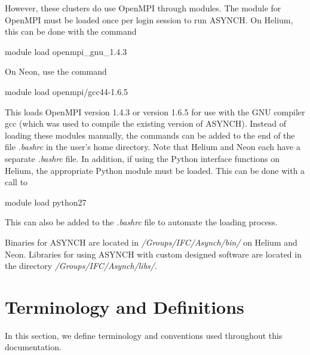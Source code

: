 \documentclass[12pt]{article}
\newenvironment{codeindent}
{\begin{list}{}
        {\setlength{\leftmargin}{.1in}}
        \item[]
}
{\end{list}}
\begin{document}
However, these clusters do use OpenMPI through modules. The module for OpenMPI must be loaded once per login session to run ASYNCH. On Helium, this can be done with the command
\begin{codeindent}
module load openmpi\_gnu\_1.4.3
\end{codeindent}
On Neon, use the command
\begin{codeindent}
module load openmpi/gcc44-1.6.5
\end{codeindent}
This loads OpenMPI version 1.4.3 or version 1.6.5 for use with the GNU compiler gcc (which was used to compile the existing version of ASYNCH). Instead of loading these modules manually, the commands can be added to the end of the file \emph{.bashrc} in the user's home directory. Note that Helium and Neon each have a separate \emph{.bashrc} file. In addition, if using the Python interface functions on Helium, the appropriate Python module must be loaded. This can be done with a call to
\begin{codeindent}
module load python27
\end{codeindent}
This can also be added to the \emph{.bashrc} file to automate the loading process.

Binaries for ASYNCH are located in \emph{/Groups/IFC/Asynch/bin/} on Helium and Neon. Libraries for using ASYNCH with custom designed software are located in the directory \emph{/Groups/IFC/Asynch/libs/}.

\section{Terminology and Definitions} \label{sec: terminology and definitions}

In this section, we define terminology and conventions used throughout this documentation.
\end{document}
